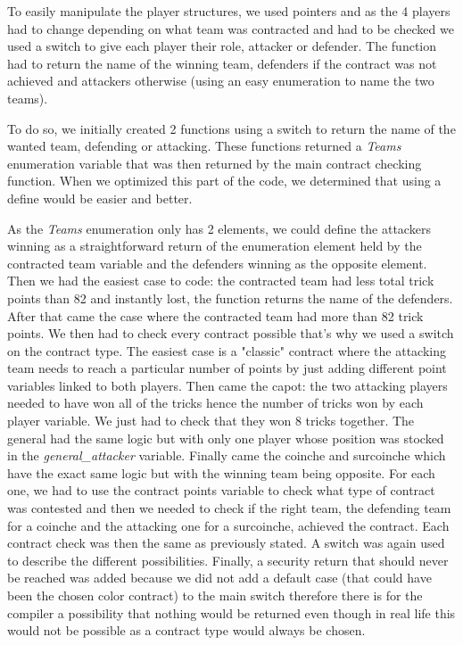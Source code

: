 \documentclass[12pt]{article}
\begin{document}
To easily manipulate the player structures, we used pointers and as the 4 players had to change depending on what team was contracted and had to be checked we used a switch to give each player their role, attacker or defender.
The function had to return the name of the winning team, defenders if the contract was not achieved and attackers otherwise (using an easy enumeration to name the two teams).

To do so, we initially created 2 functions using a switch to return the name of the wanted team, defending or attacking.
These functions returned a \textit{Teams} enumeration variable that was then returned by the main contract checking function.
When we optimized this part of the code, we determined that using a define would be easier and better.

As the \textit{Teams} enumeration only has 2 elements, we could define the attackers winning as a straightforward return of the enumeration element held by the contracted team variable and the defenders winning as the opposite element.
Then we had the easiest case to code: the contracted team had less total trick points than 82 and instantly lost, the function returns the name of the defenders.
After that came the case where the contracted team had more than 82 trick points.
We then had to check every contract possible that’s why we used a switch on the contract type.
The easiest case is a "classic" contract where the attacking team needs to reach a particular number of points by just adding different point variables linked to both players.
Then came the capot: the two attacking players needed to have won all of the tricks hence the number of tricks won by each player variable.
We just had to check that they won 8 tricks together.
The general had the same logic but with only one player whose position was stocked in the \textit{general\_attacker} variable.
Finally came the coinche and surcoinche which have the exact same logic but with the winning team being opposite.
For each one, we had to use the contract points variable to check what type of contract was contested and then we needed to check if the right team, the defending team for a coinche and the attacking one for a surcoinche, achieved the contract.
Each contract check was then the same as previously stated.
A switch was again used to describe the different possibilities.
Finally, a security return that should never be reached was added because we did not add a default case (that could have been the chosen color contract) to the main switch therefore there is for the compiler a possibility that nothing would be returned even though in real life this would not be possible as a contract type would always be chosen.
\end{document}
